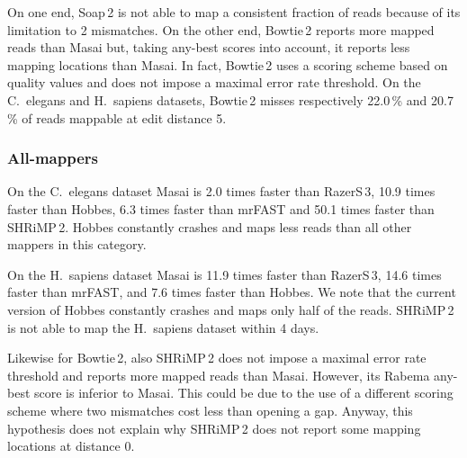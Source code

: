 On one end, Soap\,2 is not able to map a consistent fraction of reads because of its limitation to 2 mismatches.
On the other end, Bowtie\,2 reports more mapped reads than Masai but, taking any-best scores into account, it reports less mapping locations than Masai.
In fact, Bowtie\,2 uses a scoring scheme based on quality values and does not impose a maximal error rate threshold.
On the C.~elegans and H.~sapiens datasets, Bowtie\,2 misses respectively 22.0\,\% and 20.7\,\% of reads mappable at edit distance 5.


\subsubsection{All-mappers}
On the C.~elegans dataset Masai is 2.0 times faster than RazerS\,3, 10.9 times faster than Hobbes, 6.3 times faster than mrFAST and 50.1 times faster than SHRiMP\,2.
Hobbes constantly crashes and maps less reads than all other mappers in this category.

On the H.~sapiens dataset Masai is 11.9 times faster than RazerS\,3, 14.6 times faster than mrFAST, and 7.6 times faster than Hobbes.
We note that the current version of Hobbes constantly crashes and maps only half of the reads.
SHRiMP\,2 is not able to map the H.~sapiens dataset within 4 days.

Likewise for Bowtie\,2, also SHRiMP\,2 does not impose a maximal error rate threshold and reports more mapped reads than Masai.
However, its Rabema any-best score is inferior to Masai.
This could be due to the use of a different scoring scheme where two mismatches cost less than opening a gap.
Anyway, this hypothesis does not explain why SHRiMP\,2 does not report some mapping locations at distance 0.

